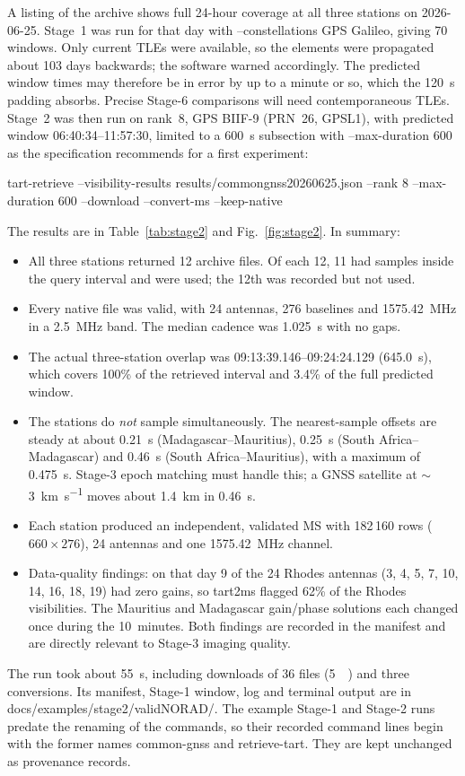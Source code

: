 \documentclass[11pt,a4paper]{article}
\newcommand{\code}[1]{{\ttfamily\def\_{\textunderscore\allowbreak}#1}}
\begin{document}
A listing of the archive shows full 24-hour coverage at all three stations
on 2026-06-25. Stage~1 was run for that day with \code{--constellations GPS
Galileo}, giving 70 windows. Only current TLEs were available, so the
elements were propagated about 103 days backwards; the software warned
accordingly. The predicted window times may therefore be in error by up to
a minute or so, which the \SI{120}{\second} padding absorbs. Precise
Stage-6 comparisons will need contemporaneous TLEs. Stage~2 was then run on
rank~8, GPS BIIF-9 (PRN~26, \code{GPS\_L1}), with predicted window
06:40:34--11:57:30, limited to a \SI{600}{\second} subsection with
\code{--max-duration 600} as the specification recommends for a first
experiment:
\begin{center}
\code{tart-retrieve --visibility-results results/common\_gnss\_20260625.json
--rank 8 --max-duration 600 --download --convert-ms --keep-native}
\end{center}
The results are in Table~\ref{tab:stage2} and Fig.~\ref{fig:stage2}. In
summary:
\begin{itemize}
\item All three stations returned 12 archive files. Of each 12, 11 had
samples inside the query interval and were used; the 12th was recorded but
not used.
\item Every native file was valid, with 24 antennas, 276 baselines and
\SI{1575.42}{\mega\hertz} in a \SI{2.5}{\mega\hertz} band. The median
cadence was \SI{1.025}{\second} with no gaps.
\item The actual three-station overlap was 09:13:39.146--09:24:24.129
(\SI{645.0}{\second}), which covers 100\% of the retrieved interval and
3.4\% of the full predicted window.
\item The stations do \emph{not} sample simultaneously. The nearest-sample
offsets are steady at about \SI{0.21}{\second} (Madagascar--Mauritius),
\SI{0.25}{\second} (South Africa--Madagascar) and \SI{0.46}{\second}
(South Africa--Mauritius), with a maximum of \SI{0.475}{\second}. Stage-3
epoch matching must handle this; a GNSS satellite at
$\sim$\SI{3}{\kilo\metre\per\second} moves about \SI{1.4}{\kilo\metre} in
\SI{0.46}{\second}.
\item Each station produced an independent, validated MS with 182\,160 rows
($660\times276$), 24 antennas and one \SI{1575.42}{\mega\hertz} channel.
\item Data-quality findings: on that day 9 of the 24 Rhodes antennas (3, 4,
5, 7, 10, 14, 16, 18, 19) had zero gains, so \code{tart2ms} flagged 62\% of
the Rhodes visibilities. The Mauritius and Madagascar gain/phase solutions
each changed once during the 10~minutes. Both findings are recorded in the
manifest and are directly relevant to Stage-3 imaging quality.
\end{itemize}
The run took about \SI{55}{\second}, including downloads of 36 files
(\SI{5}{\mega\byte}) and three conversions. Its manifest, Stage-1 window,
log and terminal output are in
\code{docs/examples/stage2/valid\_20260625\_NORAD\_40534/}. The example
Stage-1 and Stage-2 runs predate the renaming of the commands, so their
recorded command lines begin with the former names \code{common-gnss} and
\code{retrieve-tart}. They are kept unchanged as provenance records.
\end{document}
